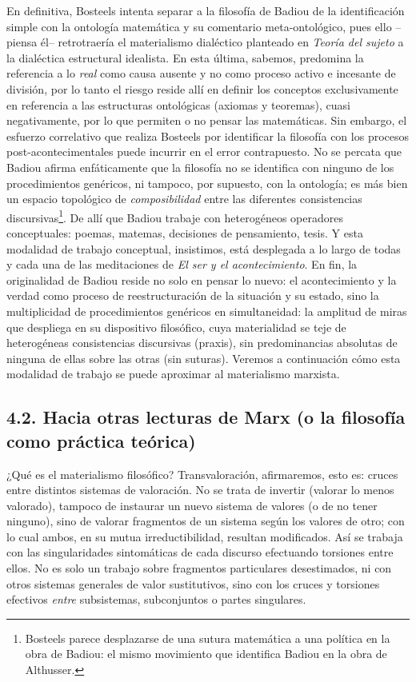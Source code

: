 En definitiva, Bosteels intenta separar a la filosofía de Badiou de la
identificación simple con la ontología matemática y su comentario
meta-ontológico, pues ello --piensa él-- retrotraería el materialismo
dialéctico planteado en \emph{Teoría del sujeto} a la dialéctica
estructural idealista. En esta última, sabemos, predomina la referencia
a lo \emph{real} como causa ausente y no como proceso activo e incesante
de división, por lo tanto el riesgo reside allí en definir los conceptos
exclusivamente en referencia a las estructuras ontológicas (axiomas y
teoremas), cuasi negativamente, por lo que permiten o no pensar las
matemáticas. Sin embargo, el esfuerzo correlativo que realiza Bosteels
por identificar la filosofía con los procesos post-acontecimentales
puede incurrir en el error contrapuesto. No se percata que Badiou afirma
enfáticamente que la filosofía no se identifica con ninguno de los
procedimientos genéricos, ni tampoco, por supuesto, con la ontología; es
más bien un espacio topológico de \emph{composibilidad} entre las
diferentes consistencias discursivas\footnote{Bosteels parece
  desplazarse de una sutura matemática a una política en la obra de
  Badiou: el mismo movimiento que identifica Badiou en la obra de
  Althusser.}. De allí que Badiou trabaje con heterogéneos operadores
conceptuales: poemas, matemas, decisiones de pensamiento, tesis. Y esta
modalidad de trabajo conceptual, insistimos, está desplegada a lo largo
de todas y cada una de las meditaciones de \emph{El ser y el
acontecimiento}. En fin, la originalidad de Badiou reside no solo en
pensar lo nuevo: el acontecimiento y la verdad como proceso de
reestructuración de la situación y su estado, sino la multiplicidad de
procedimientos genéricos en simultaneidad: la amplitud de miras que
despliega en su dispositivo filosófico, cuya materialidad se teje de
heterogéneas consistencias discursivas (praxis), sin predominancias
absolutas de ninguna de ellas sobre las otras (sin suturas). Veremos a
continuación cómo esta modalidad de trabajo se puede aproximar al
materialismo marxista.

\subsection{4.2. Hacia otras lecturas de Marx (o la filosofía como práctica
teórica)}

¿Qué es el materialismo filosófico? Transvaloración, afirmaremos, esto
es: cruces entre distintos sistemas de valoración. No se trata de
invertir (valorar lo menos valorado), tampoco de instaurar un nuevo
sistema de valores (o de no tener ninguno), sino de valorar fragmentos
de un sistema según los valores de otro; con lo cual ambos, en su mutua
irreductibilidad, resultan modificados. Así se trabaja con las
singularidades sintomáticas de cada discurso efectuando torsiones entre
ellos. No es solo un trabajo sobre fragmentos particulares desestimados,
ni con otros sistemas generales de valor sustitutivos, sino con los
cruces y torsiones efectivos \emph{entre} subsistemas, subconjuntos o
partes singulares.

